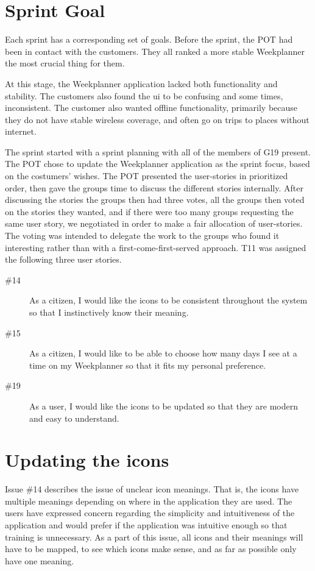 \section{Sprint Goal}

Each sprint has a corresponding set of goals. Before the sprint, the \gls{POT} had been in contact with the customers. They all ranked a more stable Weekplanner the most crucial thing for them.

At this stage, the Weekplanner application lacked both functionality and stability. The customers also found the \gls{ui} to be confusing and some times, inconsistent. The customer also wanted offline functionality, primarily because they do not have stable wireless coverage, and often go on trips to places without internet.

The sprint started with a sprint planning with all of the members of \gls{G19} present. The \gls{POT} chose to update the Weekplanner application as the sprint focus, based on the costumers' wishes. The \gls{POT} presented the user-stories in prioritized order, then gave the groups time to discuss the different stories internally. After discussing the stories the groups then had three votes, all the groups then voted on the stories they wanted, and if there were too many groups requesting the same user story, we negotiated in order to make a fair allocation of user-stories. The voting was intended to delegate the work to the groups who found it interesting rather than with a first-come-first-served approach. \gls{T11} was assigned the following three user stories.

\begin{description}
    \item [\#14] As a citizen, I would like the icons to be consistent throughout the system so that I instinctively know their meaning.
    \item [\#15] As a citizen, I would like to be able to choose how many days I see at a time on my Weekplanner so that it fits my personal preference.
    \item [\#19] As a user, I would like the icons to be updated so that they are modern and easy to understand.
\end{description}

\section{Updating the icons}

Issue \#14 describes the issue of unclear icon meanings. That is, the icons have multiple meanings depending on where in the application they are used. The users have expressed concern regarding the simplicity and intuitiveness of the application and would prefer if the application was intuitive enough so that training is unnecessary. As a part of this issue, all icons and their meanings will have to be mapped, to see which icons make sense, and as far as possible only have one meaning. 

